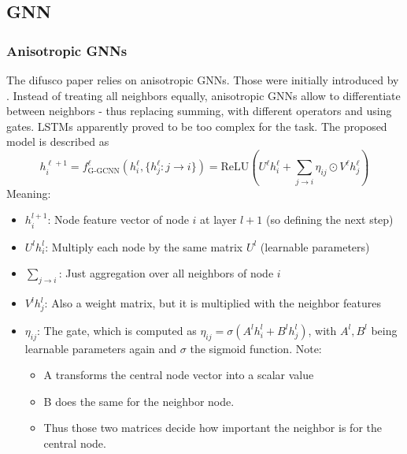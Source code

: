 \subsection{GNN}

\subsubsection{Anisotropic GNNs}
The difusco paper \cite{sun-23-difusco} relies on anisotropic GNNs. Those were initially introduced by \cite{bresson-18-nn-for-variable-graphs}. Instead of treating all neighbors equally, anisotropic GNNs allow to differentiate between neighbors - thus replacing summing, with different operators and using gates. LSTMs apparently proved to be too complex for the task. 
The proposed model is described as $$h_i^{\ell+1} = f_{\text{G-GCNN}}^{\ell} \left( h_i^{\ell} , \{h_j^{\ell} : j \to i\} \right) = \text{ReLU} \left( U^{\ell} h_i^{\ell} + \sum_{j \to i} \eta_{ij} \odot V^{\ell} h_j^{\ell} \right)$$
Meaning:
\begin{itemize}
    \item $h_{i}^{l+1}$: Node feature vector of node $i$ at layer $l+1$ (so defining the next step)
    \item $U^{l}h_{i}^{l}$: Multiply each node by the same matrix $U^{l}$ (learnable parameters)
    \item $\sum_{j\rightarrow i}$: Just aggregation over all neighbors of node $i$
    \item $V^{l}h_{j}^{l}$: Also a weight matrix, but it is multiplied with the neighbor features
    \item $\eta_{ij}$: The gate, which is computed as $\eta_{ij} = \sigma \left( A^{l} h_i^{l} + B^{l} h_j^{l} \right)$, with $A^{l}, B^{l}$ being learnable parameters again and $\sigma$ the sigmoid function. Note: \begin{itemize}
        \item A transforms the central node vector into a scalar value
        \item B does the same for the neighbor node. 
        \item Thus those two matrices decide how important the neighbor is for the central node.
    \end{itemize}
\end{itemize}

